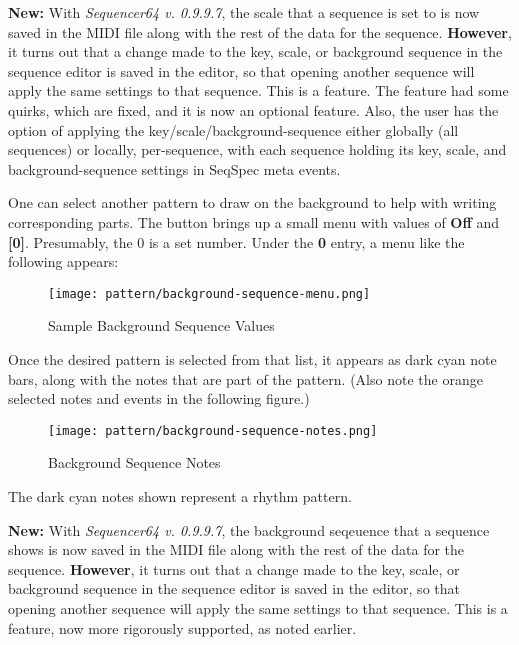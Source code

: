    \textbf{New:}
   With \textsl{Sequencer64 v. 0.9.9.7}, the scale that a sequence is set to is
   now saved in the MIDI file along with the rest of the data for the sequence.
   \textbf{However},
   it turns out that a change made to the key, scale, or background sequence in
   the sequence editor is saved in the editor, so that opening another sequence
   will apply the same settings to that sequence.  This is a feature.
   The feature had some quirks, which are fixed, and it is now
   an optional feature.
   Also, the user has the option of applying the key/scale/background-sequence
   either globally (all sequences) or locally, per-sequence, with each sequence
   holding its key, scale, and background-sequence settings in
   SeqSpec meta events.

   One can select another pattern to draw on the background to help with
   writing corresponding parts.
   The button brings up a small menu with values of \textbf{Off} and
   \textbf{[0]}.  Presumably, the 0 is a set number.  Under the \textbf{0}
   entry, a menu like the following appears:

\begin{figure}[H]
   \centering 
   \texttt{[image: pattern/background-sequence-menu.png]}
   \caption{Sample Background Sequence Values}
   \label{fig:pattern_editor_background_sequence_menu}
\end{figure}

   Once the desired pattern is selected from that list, it appears as
   dark cyan note bars, along with the notes that are part of the pattern.
   (Also note the orange selected notes and events in the following figure.)

\begin{figure}[H]
   \centering 
   \texttt{[image: pattern/background-sequence-notes.png]}
   \caption{Background Sequence Notes}
   \label{fig:pattern_editor_background_sequence_notes}
\end{figure}

   The dark cyan notes shown represent a rhythm pattern.

   \textbf{New:}
   With \textsl{Sequencer64 v. 0.9.9.7}, the background seqeuence that a
   sequence shows is now saved in the MIDI file along with the rest of the
   data for the sequence.
   \textbf{However},
   it turns out that a change made to the key, scale, or background sequence in
   the sequence editor is saved in the editor, so that opening another sequence
   will apply the same settings to that sequence.  This is a feature, now
   more rigorously supported, as noted earlier.

